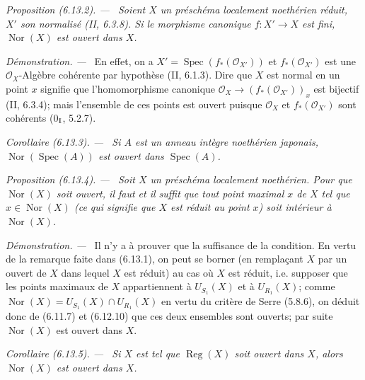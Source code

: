\documentclass[10pt,oneside]{book}
\newenvironment{proposition}[1][]{%
  \par\medskip\noindent\itshape Proposition (#1). ---\ }{\par}
\newenvironment{corollary}[1][]{%
  \par\medskip\noindent\itshape Corollaire (#1). ---\ }{\par}
\newenvironment{proof}{%
  \par\medskip\noindent\textit{Démonstration. ---\ }}{\par}
\begin{document}
\begin{proposition}[6.13.2]
\label{IV.2.s6.13.2-fr}
Soient $X$ un préschéma localement noethérien réduit, $X'$ son normalisé
(II, 6.3.8). Si le morphisme canonique $f:X'\to X$ est fini,
$\operatorname{Nor}(X)$ est ouvert dans $X$.
\end{proposition}

\begin{proof}
En effet, on a $X'=\operatorname{Spec}(f_*(\mathcal O_{X'}))$ et
$f_*(\mathcal O_{X'})$ est une $\mathcal O_X$-Algèbre cohérente par
hypothèse (II, 6.1.3). Dire que $X$ est normal en un point $x$ signifie que
l'homomorphisme canonique
$\mathcal O_X\to(f_*(\mathcal O_{X'}))_x$ est bijectif (II, 6.3.4); mais
l'ensemble de ces points est ouvert puisque $\mathcal O_X$ et
$f_*(\mathcal O_{X'})$ sont cohérents (0$_{\rm I}$, 5.2.7).
\end{proof}

\begin{corollary}[6.13.3]
\label{IV.2.s6.13.3-fr}
Si $A$ est un anneau intègre noethérien japonais,
$\operatorname{Nor}(\operatorname{Spec}(A))$ est ouvert dans
$\operatorname{Spec}(A)$.
\end{corollary}

\begin{proposition}[6.13.4]
\label{IV.2.s6.13.4-fr}
Soit $X$ un préschéma localement noethérien. Pour que
$\operatorname{Nor}(X)$ soit ouvert, il faut et il suffit que tout point
maximal $x$ de $X$ tel que $x\in\operatorname{Nor}(X)$ (ce qui signifie que
$X$ est réduit au point $x$) soit intérieur à $\operatorname{Nor}(X)$.
\end{proposition}

\begin{proof}
Il n'y a à prouver que la suffisance de la condition. En vertu de la
remarque faite dans (6.13.1), on peut se borner (en remplaçant $X$ par un
ouvert de $X$ dans lequel $X$ est réduit) au cas où $X$ est réduit, i.e.
supposer que les points maximaux de $X$ appartiennent à $U_{S_1}(X)$ et à
$U_{R_1}(X)$; comme
$\operatorname{Nor}(X)=U_{S_1}(X)\cap U_{R_1}(X)$ en vertu du critère de
Serre (5.8.6), on déduit donc de (6.11.7) et (6.12.10) que ces deux ensembles
sont ouverts; par suite $\operatorname{Nor}(X)$ est ouvert dans $X$.
\end{proof}

\begin{corollary}[6.13.5]
\label{IV.2.s6.13.5-fr}
Si $X$ est tel que $\operatorname{Reg}(X)$ soit ouvert dans $X$, alors
$\operatorname{Nor}(X)$ est ouvert dans $X$.
\end{corollary}
\end{document}
